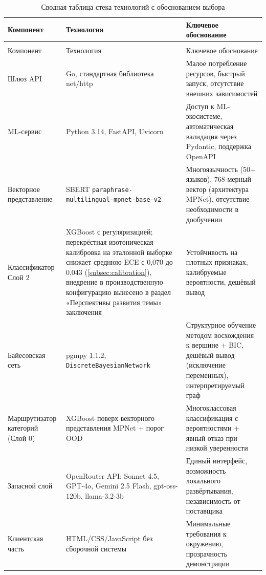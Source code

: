 \begin{xltabular}{\textwidth}{|>{\raggedright\arraybackslash}p{3.0cm}|>{\raggedright\arraybackslash}p{5.5cm}|>{\raggedright\arraybackslash}X|}
\caption{Сводная таблица стека технологий с обоснованием выбора}\label{tab:tech_stack} \\ \hline
    Компонент & Технология & Ключевое обоснование \\ \hline
\endfirsthead
{} \\ \hline
    Компонент & Технология & Ключевое обоснование \\ \hline
\endhead
    Шлюз API & Go, стандартная библиотека net/http & Малое потребление ресурсов, быстрый запуск, отсутствие внешних зависимостей \\ \hline
    ML-сервис & Python 3.14, FastAPI, Uvicorn & Доступ к ML-экосистеме, автоматическая валидация через Pydantic, поддержка OpenAPI \\ \hline
    Векторное представление & SBERT \texttt{paraphrase-\allowbreak multilingual-\allowbreak mpnet-\allowbreak base-v2} & Многоязычность (50+ языков), 768-мерный вектор (архитектура MPNet), отсутствие необходимости в дообучении \\ \hline
    Классификатор Слой 2 & XGBoost с регуляризацией; перекрёстная изотоническая калибровка на эталонной выборке снижает среднюю ECE с 0,070 до 0,043 (\ref{subsec:calibration}), внедрение в производственную конфигурацию вынесено в раздел «Перспективы развития темы» заключения & Устойчивость на плотных признаках, калибруемые вероятности, дешёвый вывод \\ \hline
    Байесовская сеть & pgmpy 1.1.2, \texttt{Discrete}\allowbreak\texttt{BayesianNetwork} & Структурное обучение методом восхождения к вершине + BIC, дешёвый вывод (исключение переменных), интерпретируемый граф \\ \hline
    Маршрутизатор категорий (Слой 0) & XGBoost поверх векторного представления MPNet + порог OOD & Многоклассовая классификация с вероятностями + явный отказ при низкой уверенности \\ \hline
    Запасной слой & OpenRouter API: Sonnet 4.5, GPT-4o, Gemini 2.5 Flash, gpt-oss-120b, llama-3.2-3b & Единый интерфейс, возможность локального развёртывания, независимость от поставщика \\ \hline
    Клиентская часть & HTML/CSS/JavaScript без сборочной системы & Минимальные требования к окружению, прозрачность демонстрации \\ \hline
\end{xltabular}

